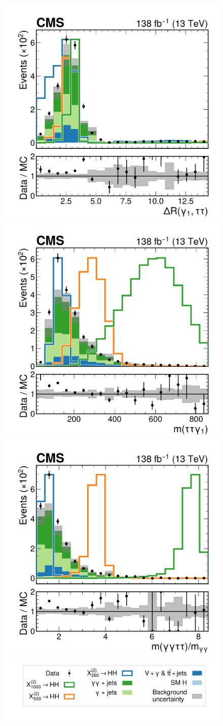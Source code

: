 \begin{figure}
    \centering
    \includegraphics[width=.49\linewidth]{Figures/Dihiggs/categorisation/input_features/Graviton/Scale_equal/LeadPhoton_ditau_dR_GluGluToBulkGravitonToHHTo2G2Tau_M-1000_linear.pdf}
    \includegraphics[width=.49\linewidth]{Figures/Dihiggs/categorisation/input_features/Graviton/Scale_equal/dilep_leadpho_mass_GluGluToBulkGravitonToHHTo2G2Tau_M-1000_linear.pdf} \\
    \includegraphics[width=.49\linewidth]{Figures/Dihiggs/categorisation/input_features/Graviton/Scale_equal/reco_MX_mgg_GluGluToBulkGravitonToHHTo2G2Tau_M-1000_linear.pdf} \\
    \includegraphics[width=.7\linewidth]{Figures/Dihiggs/categorisation/input_features/Graviton/Scale_equal/legend.pdf}

\end{figure}
